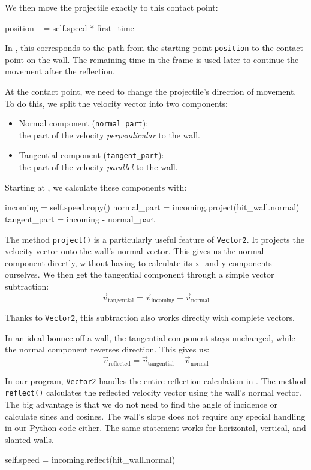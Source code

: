 We then move the projectile exactly to this contact point:
\begin{codebox}
	position += self.speed * first_time
\end{codebox}

In , this corresponds to the path from the starting point \texttt{position} to the contact point on the wall.
The remaining time in the frame is used later to continue the movement after the reflection.

At the contact point, we need to change the projectile's direction of movement. To do this, we split the velocity vector into two components:
\begin{itemize}
	\item Normal component (\texttt{normal\_part}): \\the part of the velocity \emph{perpendicular} to the wall.
	\item Tangential component (\texttt{tangent\_part}): \\the part of the velocity \emph{parallel} to the wall.
\end{itemize}
Starting at , we calculate these components with:
\begin{codebox}
    incoming = self.speed.copy()
    normal_part = incoming.project(hit_wall.normal)
    tangent_part = incoming - normal_part
\end{codebox}

The method \texttt{project()} is a particularly useful feature of \texttt{Vector2}. It projects the velocity vector onto the wall's normal vector.
This gives us the normal component directly, without having to calculate its x- and y-components ourselves.
We then get the tangential component through a simple vector subtraction:
\[
\vec v_{\mathrm{tangential}}
=
\vec v_{\mathrm{incoming}}
-
\vec v_{\mathrm{normal}}
\]

Thanks to \texttt{Vector2}, this subtraction also works directly with complete vectors.

In an ideal bounce off a wall, the tangential component stays unchanged, while the normal component reverses direction.
This gives us:
\[
\vec v_{\mathrm{reflected}}
=
\vec v_{\mathrm{tangential}}
-
\vec v_{\mathrm{normal}}
\]

In our program, \texttt{Vector2} handles the entire reflection calculation in . The method \texttt{reflect()} calculates the reflected velocity vector using the wall's normal vector. The big advantage is that we do not need to find the angle of incidence or calculate sines and cosines. The wall's slope does not require any special handling in our Python code either. The same statement works for horizontal, vertical, and slanted walls.
\begin{codebox}
	self.speed = incoming.reflect(hit_wall.normal)
\end{codebox}

